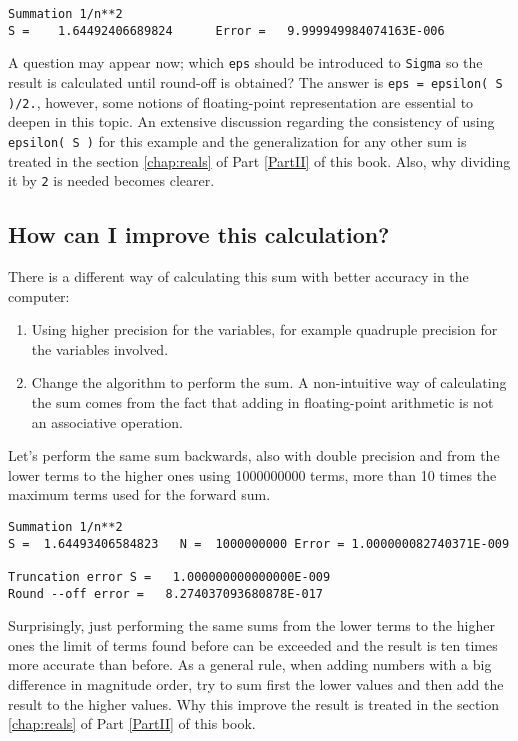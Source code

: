 \begin{verbatim} 
Summation 1/n**2
S =    1.64492406689824      Error =   9.999949984074163E-006
\end{verbatim}

A question may appear now; which \texttt{eps} should be introduced to \texttt{Sigma} so the result is calculated until round-off is obtained?
The answer is \texttt{eps = epsilon( S )/2.}, however, some notions of floating-point representation are essential to deepen in this topic.
An extensive discussion regarding the consistency of using \texttt{epsilon( S )} for this example and the generalization for any other sum 
is treated in the section \ref{chap:reals} of Part \ref{PartII} of this book. Also, why dividing it by \texttt{2} is needed becomes clearer. 




 
    \subsection{How can I improve this calculation?}
    
There is a different way of calculating this sum with better accuracy in the computer:
\begin{enumerate}
    \item Using higher precision for the variables, for example quadruple precision for the variables involved. 
    \item Change the algorithm to perform the sum. A non-intuitive way of calculating the sum comes from the fact
    that adding in floating-point arithmetic is not an associative operation. 
\end{enumerate}

Let's perform the same sum backwards, also with double precision and from the lower terms to the higher ones using 1000000000 terms, more than 10 times the maximum terms
used for the forward sum. 

\begin{verbatim} 
Summation 1/n**2
S =  1.64493406584823   N =  1000000000 Error = 1.000000082740371E-009

Truncation error S =   1.000000000000000E-009
Round --off error =   8.274037093680878E-017
\end{verbatim}
 
Surprisingly, just performing the same sums from the lower terms to the higher ones the 
limit of terms found before can be exceeded and the result is ten times more accurate than before. 
As a general rule, when adding numbers with a big difference in magnitude order, 
try to sum first the lower values and then add the result to the higher values. 
Why this improve the result is 
treated in the section \ref{chap:reals} of Part \ref{PartII} of this book.
 
